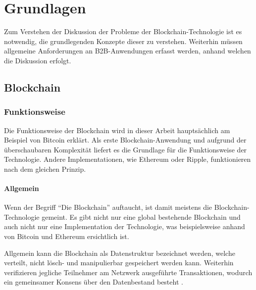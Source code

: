 \chapter{Grundlagen}
\label{cha:grundlagen}
Zum Verstehen der Diskussion der Probleme der Blockchain-Technologie ist es notwendig, die grundlegenden Konzepte dieser zu verstehen. Weiterhin müssen allgemeine Anforderungen an \acs{B2B}-Anwendungen erfasst werden, anhand welchen die Diskussion erfolgt.

\section{Blockchain}

\subsection{Funktionsweise}
Die Funktionsweise der Blockchain wird in dieser Arbeit hauptsächlich am Beispiel von Bitcoin erklärt. Als erste Blockchain-Anwendung \cite{ZhengBlockchainChallengesOpportunities2017} und aufgrund der überschaubaren Komplexität liefert es die Grundlage für die Funktionsweise der Technologie. Andere Implementationen, wie Ethereum oder Ripple, funktionieren nach dem gleichen Prinzip.

\subsubsection{Allgemein}
Wenn der Begriff ``Die Blockchain'' auftaucht, ist damit meistens die Blockchain-Technologie gemeint. Es gibt nicht nur eine global bestehende Blockchain und auch nicht nur eine Implementation der Technologie, was beispielsweise anhand von Bitcoin und Ethereum ersichtlich ist.

Allgemein kann die Blockchain als Datenstruktur bezeichnet werden, welche verteilt, nicht lösch- und manipulierbar gespeichert werden kann. Weiterhin verifizieren jegliche Teilnehmer am Netzwerk ausgeführte Transaktionen, wodurch ein gemeinsamer Konsens über den Datenbestand besteht \cite{CrosbyBlockChainTechnologyBitcoin2016}.

